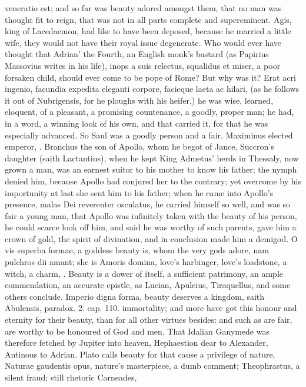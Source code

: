 {{veneratio est}; and so
far was beauty adored amongst them, that no man was thought fit to
reign, that was not in all parts complete and supereminent. Agis, king
of Lacedaemon, had like to have been deposed, because he married a
little wife, they would not have their royal issue degenerate. Who
would ever have thought that Adrian' the Fourth, an English monk's
bastard (as Papirius Massovius writes in his life), inops a suis
relectus, squalidus et miser, a poor forsaken child, should ever come
to be pope of Rome? But why was it? Erat acri ingenio, facundia
expedita eleganti corpore, facieque laeta ac hilari, (as he follows it
out of Nubrigensis, for he ploughs with his heifer,) he was wise,
learned, eloquent, of a pleasant, a promising countenance, a goodly,
proper man; he had, in a word, a winning look of his own, and that
carried it, for that he was especially advanced. So Saul was a goodly
person and a fair. Maximinus elected emperor, \etc{}. Branchus the son of
Apollo, whom he begot of Jance, Succron's daughter (saith Lactantius),
when he kept King Admetus' herds in Thessaly, now grown a man, was an
earnest suitor to his mother to know his father; the nymph denied him,
because Apollo had conjured her to the contrary; yet overcome by his
importunity at last she sent him to his father; when he came into
Apollo's presence, malas Dei reverenter osculatus, he carried himself
so well, and was so fair a young man, that Apollo was infinitely taken
with the beauty of his person, he could scarce look off him, and said
he was worthy of such parents, gave him a crown of gold, the spirit of
divination, and in conclusion made him a demigod. O vis superba formae,
a goddess beauty is, whom the very gods adore, nam pulchros dii amant;
she is Amoris domina, love's harbinger, love's loadstone, a witch, a
charm, \etc{}. Beauty is a dower of itself, a sufficient patrimony, an
ample commendation, an accurate epistle, as Lucian,
Apuleius, Tiraquellus, and some others conclude. Imperio digna
forma, beauty deserves a kingdom, saith Abulensis, paradox. 2. cap.
110. immortality; and more have got this honour and eternity for
their beauty, than for all other virtues besides: and such as are fair,
are worthy to be honoured of God and men. That Idalian Ganymede was
therefore fetched by Jupiter into heaven, Hephaestion dear to
Alexander, Antinous to Adrian. Plato calls beauty for that cause a
privilege of nature, Naturae gaudentis opus, nature's masterpiece, a
dumb comment; Theophrastus, a silent fraud; still rhetoric Carneades,
}
